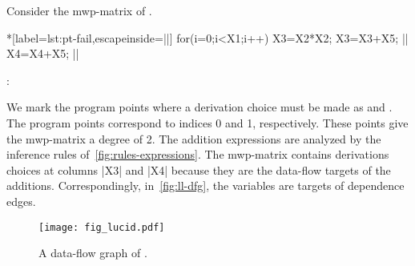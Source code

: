 \begin{example}\label{ex:mat}
Consider the mwp-matrix of \explain.

\begin{center}
\begin{minipage}{\linewidth}
\begin{minipage}{.28\linewidth}
\begin{implisting}*[label={lst:pt-fail},escapeinside=||]
for(i=0;i<X1;i++)
{ X3=X2*X2;
  X3=X3+X5; ||
  X4=X4+X5; || }
\end{implisting}
\end{minipage}%
\hfill : \hfill%
\end{minipage}
\end{center}

We mark the program points where a derivation choice must be made as  and .
The program points correspond to indices 0 and 1, respectively.
These points give the mwp-matrix a degree of 2.
The addition expressions are analyzed by the inference rules of~\autoref{fig:rules-expressions}.
The mwp-matrix contains derivations choices at columns \pr|X3| and \pr|X4| because they are the data-flow targets of the additions.
Correspondingly, in~\autoref{fig:ll-dfg}, the variables are targets of dependence edges.

\begin{figure}[H]
\centering
\texttt{[image: fig\_lucid.pdf]}
\caption[A data-flow graph of \exname]{A data-flow graph of \exname.}
\label{fig:ll-dfg}
\end{figure}


\end{example}
